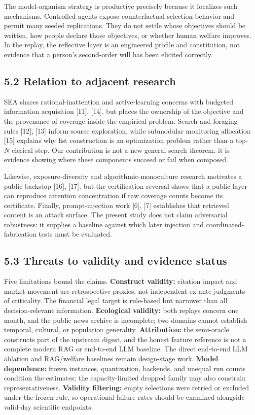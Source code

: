 \documentclass[
  conference,10pt]{IEEEtran}
\begin{document}
The model-organism strategy is productive precisely because it localizes such mechanisms. Controlled agents expose counterfactual selection behavior and permit many seeded replications. They do not settle whose objectives should be written, how people declare those objectives, or whether human welfare improves. In the replay, the reflective layer is an engineered profile and constitution, not evidence that a person's second-order will has been elicited correctly.

\subsection{5.2 Relation to adjacent research}\label{relation-to-adjacent-research}

SEA shares rational-inattention and active-learning concerns with budgeted information acquisition {[}11{]}, {[}14{]}, but places the ownership of the objective and the provenance of coverage inside the empirical problem. Search and foraging rules {[}12{]}, {[}13{]} inform source exploration, while submodular monitoring allocation {[}15{]} explains why list construction is an optimization problem rather than a top-\(N\) clerical step. Our contribution is not a new general search theorem; it is evidence showing where these components succeed or fail when composed.

Likewise, exposure-diversity and algorithmic-monoculture research motivates a public backstop {[}16{]}, {[}17{]}, but the certification reversal shows that a public layer can reproduce attention concentration if raw coverage counts become its certificate. Finally, prompt-injection work {[}6{]}, {[}7{]} establishes that retrieved content is an attack surface. The present study does not claim adversarial robustness: it supplies a baseline against which later injection and coordinated-fabrication tests must be evaluated.

\subsection{5.3 Threats to validity and evidence status}\label{threats-to-validity-and-evidence-status}

Five limitations bound the claims. \textbf{Construct validity:} citation impact and market movement are retrospective proxies, not independent ex ante judgments of criticality. The financial legal target is rule-based but narrower than all decision-relevant information. \textbf{Ecological validity:} both replays concern one month, and the public news archive is incomplete; two domains cannot establish temporal, cultural, or population generality. \textbf{Attribution:} the semi-oracle constructs part of the upstream digest, and the honest feature reference is not a complete modern RAG or end-to-end LLM baseline. The direct end-to-end LLM ablation and RAG/welfare baselines remain design-stage work. \textbf{Model dependence:} frozen instances, quantization, backends, and unequal run counts condition the estimates; the capacity-limited dropped family may also constrain representativeness. \textbf{Validity filtering:} empty selections were retried or excluded under the frozen rule, so operational failure rates should be examined alongside valid-day scientific endpoints.
\end{document}
